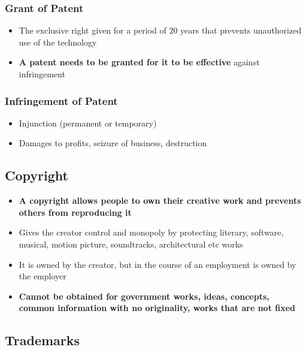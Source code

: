 \documentclass{article}
\begin{document}
\subsubsection{Grant of Patent}

\begin{itemize}
    \item The exclusive right given for a period of 20 years that prevents unauthorized use of the technology
    \item \textbf{A patent needs to be granted for it to be effective} against infringement
\end{itemize}

\subsubsection{Infringement of Patent}

\begin{itemize}
    \item Injunction (permanent or temporary)
    \item Damages to profits, seizure of business, destruction
\end{itemize}

\subsection{Copyright}

\begin{itemize}
    \item \textbf{A copyright allows people to own their creative work and prevents others from reproducing it}
    \item Gives the creator control and monopoly by protecting literary, software, musical, motion picture, soundtracks, architectural etc works
    \item It is owned by the creator, but in the course of an employment is owned by the employer
    \item \textbf{Cannot be obtained for government works, ideas, concepts, common information with no originality, works that are not fixed}
\end{itemize}

\subsection{Trademarks}
\end{document}
